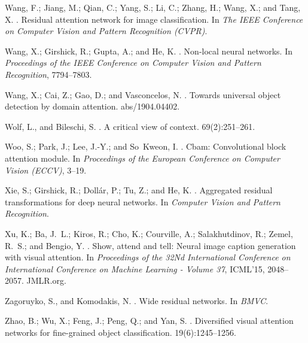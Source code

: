 \documentclass[letterpaper]{article} \usepackage{aaai20}  \usepackage{times}  \usepackage{helvet} \usepackage{courier}  \usepackage[hyphens]{url}  \usepackage{graphicx} \urlstyle{rm} \def\UrlFont{\rm}  \usepackage{graphicx}  \frenchspacing  \setlength{\pdfpagewidth}{8.5in}  \setlength{\pdfpageheight}{11in}  \usepackage{color}
\begin{document}
\begin{thebibliography}{}
	Wang, F.; Jiang, M.; Qian, C.; Yang, S.; Li, C.; Zhang, H.; Wang, X.; and Tang,
	X.
	.
	\newblock Residual attention network for image classification.
	\newblock In {\em The IEEE Conference on Computer Vision and Pattern
		Recognition (CVPR)}.
	
	Wang, X.; Girshick, R.; Gupta, A.; and He, K.
	.
	\newblock Non-local neural networks.
	\newblock In {\em Proceedings of the IEEE Conference on Computer Vision and
		Pattern Recognition},  7794--7803.
	
	Wang, X.; Cai, Z.; Gao, D.; and Vasconcelos, N.
	.
	\newblock Towards universal object detection by domain attention.
	 abs/1904.04402.
	
	Wolf, L., and Bileschi, S.
	.
	\newblock A critical view of context.
	 69(2):251--261.
	
	Woo, S.; Park, J.; Lee, J.-Y.; and So~Kweon, I.
	.
	\newblock Cbam: Convolutional block attention module.
	\newblock In {\em Proceedings of the European Conference on Computer Vision
		(ECCV)},  3--19.
	
	Xie, S.; Girshick, R.; Doll{\'a}r, P.; Tu, Z.; and He, K.
	.
	\newblock Aggregated residual transformations for deep neural networks.
	\newblock In {\em Computer Vision and Pattern Recognition}.
	
	Xu, K.; Ba, J.~L.; Kiros, R.; Cho, K.; Courville, A.; Salakhutdinov, R.; Zemel,
	R.~S.; and Bengio, Y.
	.
	\newblock Show, attend and tell: Neural image caption generation with visual
	attention.
	\newblock In {\em Proceedings of the 32Nd International Conference on
		International Conference on Machine Learning - Volume 37}, ICML'15,
	2048--2057.
	\newblock JMLR.org.
	
	Zagoruyko, S., and Komodakis, N.
	.
	\newblock Wide residual networks.
	\newblock In {\em BMVC}.
	
	Zhao, B.; Wu, X.; Feng, J.; Peng, Q.; and Yan, S.
	.
	\newblock Diversified visual attention networks for fine-grained object
	classification.
	 19(6):1245--1256.
	
\end{thebibliography}
\end{document}
